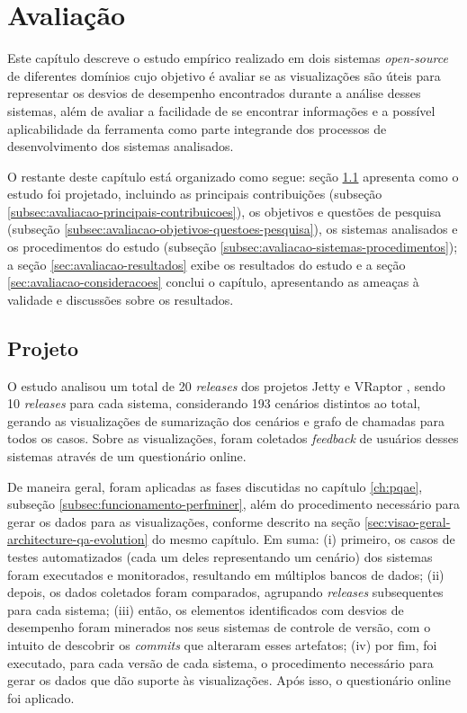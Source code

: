 \chapter{Avaliação} \label{ch:avaliacao}

Este capítulo descreve o estudo empírico realizado em dois sistemas \textit{open-source} de diferentes domínios cujo objetivo é avaliar se as visualizações são úteis para representar os desvios de desempenho encontrados durante a análise desses sistemas, além de avaliar a facilidade de se encontrar informações e a possível aplicabilidade da ferramenta como parte integrande dos processos de desenvolvimento dos sistemas analisados.

O restante deste capítulo está organizado como segue: seção \ref{sec:avaliacao-projeto} apresenta como o estudo foi projetado, incluindo as principais contribuições (subseção \ref{subsec:avaliacao-principais-contribuicoes}), os objetivos e questões de pesquisa (subseção \ref{subsec:avaliacao-objetivos-questoes-pesquisa}), os sistemas analisados e os procedimentos do estudo (subseção \ref{subsec:avaliacao-sistemas-procedimentos}); a seção \ref{sec:avaliacao-resultados} exibe os resultados do estudo e a seção \ref{sec:avaliacao-consideracoes} conclui o capítulo, apresentando as ameaças à validade e discussões sobre os resultados.

\section{Projeto} \label{sec:avaliacao-projeto}

O estudo analisou um total de 20 \textit{releases} dos projetos Jetty \cite{Jetty2016} e VRaptor \cite{VRaptor2017}, sendo 10 \textit{releases} para cada sistema, considerando 193 cenários distintos ao total, gerando as visualizações de sumarização dos cenários e grafo de chamadas para todos os casos. Sobre as visualizações, foram coletados \textit{feedback} de usuários desses sistemas através de um questionário online.

De maneira geral, foram aplicadas as fases discutidas no capítulo \ref{ch:pqae}, subseção \ref{subsec:funcionamento-perfminer}, além do procedimento necessário para gerar os dados para as visualizações, conforme descrito na seção \ref{sec:visao-geral-architecture-qa-evolution} do mesmo capítulo. Em suma: (i) primeiro, os casos de testes automatizados (cada um deles representando um cenário) dos sistemas foram executados e monitorados, resultando em múltiplos bancos de dados; (ii) depois, os dados coletados foram comparados, agrupando \textit{releases} subsequentes para cada sistema; (iii) então, os elementos identificados com desvios de desempenho foram minerados nos seus sistemas de controle de versão, com o intuito de descobrir os \textit{commits} que alteraram esses artefatos; (iv) por fim, foi executado, para cada versão de cada sistema, o procedimento necessário para gerar os dados que dão suporte às visualizações. Após isso, o questionário online foi aplicado.

